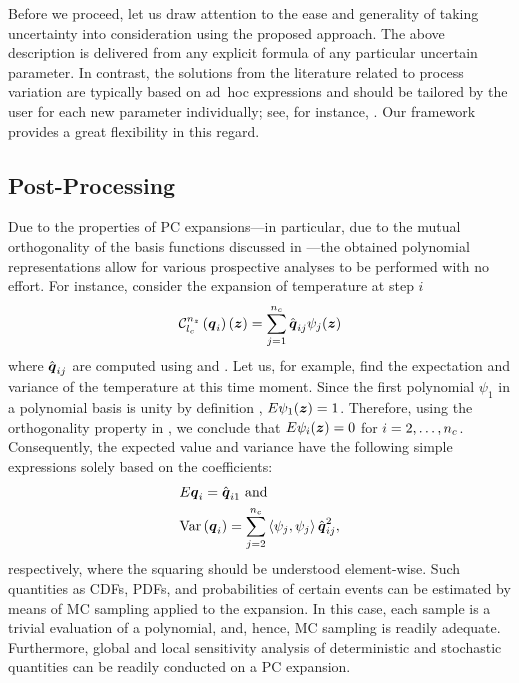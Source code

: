 Before we proceed, let us draw attention to the ease and generality of taking
uncertainty into consideration using the proposed approach. The above
description is delivered from any explicit formula of any particular uncertain
parameter. In contrast, the solutions from the literature related to process
variation are typically based on ad~hoc expressions and should be tailored by
the user for each new parameter individually; see, for instance,
\cite{ghanta2006, bhardwaj2008, huang2009a}. Our framework provides a great
flexibility in this regard.

\subsection{Post-Processing}

Due to the properties of \ac{PC} expansions---in particular, due to the mutual
orthogonality of the basis functions discussed in ---the
obtained polynomial representations allow for various prospective analyses to be
performed with no effort. For instance, consider the expansion of temperature at
step $i$
\[
  \chaos{\nz}{\lc}{\vq_i}(\vz) = \sum_{j = 1}^{\nc} \hat{\vq}_{ij} \psi_j(\vz)
\]
where $\hat{\boldsymbol{q}}_{ij}$ are computed using  and
. Let us, for example, find the expectation and
variance of the temperature at this time moment. Since the first polynomial
$\psi_1$ in a polynomial basis is unity by definition \cite{xiu2010},
$\expectation{\psi_1(\vz)} = 1$. Therefore, using the orthogonality property in
, we conclude that $\expectation{\psi_i(\vz)} =
0$ for $i = 2, \dots, {n_{c}}$. Consequently, the expected value and variance have
the following simple expressions solely based on the coefficients:
\begin{equation} \elab{chaos-moments}
  \begin{split}
    & \expectation{\vq_i} = \hat{\vq}_{i1} \text{ and} \\
    & \variance{\vq_i} = \sum_{j = 2}^{\nc} \innerproduct{\psi_j}{\psi_j} \hat{\vq}_{ij}^2,
  \end{split}
\end{equation}
respectively, where the squaring should be understood element-wise. Such
quantities as \acp{CDF}, \acp{PDF}, and probabilities of certain events can be
estimated by means of \ac{MC} sampling applied to the expansion. In this case,
each sample is a trivial evaluation of a polynomial, and, hence, \ac{MC}
sampling is readily adequate. Furthermore, global and local sensitivity analysis
of deterministic and stochastic quantities can be readily conducted on a \ac{PC}
expansion.

